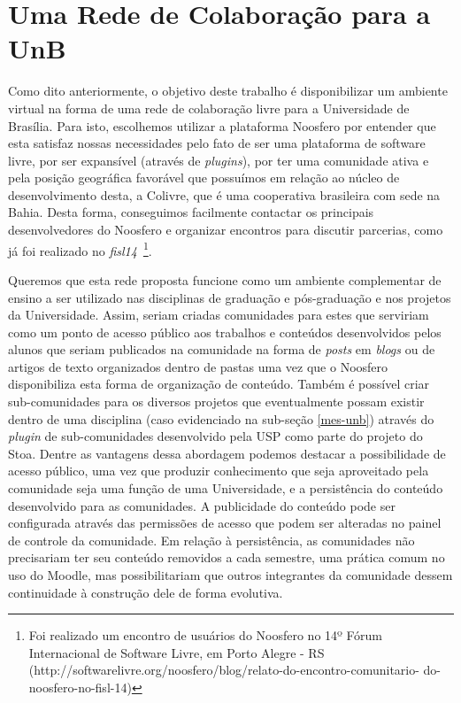 \chapter{Uma Rede de Colaboração para a UnB}

Como dito anteriormente, o objetivo deste trabalho é disponibilizar um ambiente
virtual na forma de uma rede de colaboração livre para a Universidade de
Brasília. Para isto, escolhemos utilizar a plataforma Noosfero por entender que
esta satisfaz nossas necessidades pelo fato de ser uma plataforma de software
livre, por ser expansível (através de \textit{plugins}), por ter uma comunidade
ativa e pela posição geográfica favorável que possuímos em relação ao núcleo de
desenvolvimento desta, a Colivre, que é uma cooperativa brasileira com sede na
Bahia. Desta forma, conseguimos facilmente contactar os principais desenvolvedores
do Noosfero e organizar encontros para discutir parcerias, como já foi realizado
no \textit{fisl14}~\footnote{Foi realizado um encontro de usuários do Noosfero
no 14º Fórum Internacional de Software Livre, em Porto Alegre - RS 
(\url{}http://softwarelivre.org/noosfero/blog/relato-do-encontro-comunitario-
do-noosfero-no-fisl-14)}.

Queremos que esta rede proposta funcione como um ambiente complementar de ensino
a ser utilizado nas disciplinas de graduação e pós-graduação e nos projetos da
Universidade. Assim, seriam criadas comunidades para estes
que serviriam como um ponto de acesso público aos trabalhos e conteúdos
desenvolvidos pelos alunos que seriam publicados
na comunidade na forma de \textit{posts} em \textit{blogs} ou de artigos de
texto organizados dentro de pastas uma vez que o Noosfero disponibiliza esta
forma de organização de conteúdo.
%
Também é possível criar sub-comunidades para os diversos projetos que
eventualmente possam existir dentro de uma disciplina (caso evidenciado na
sub-seção \ref{mes-unb}) através do \textit{plugin} de sub-comunidades
desenvolvido pela USP como parte do projeto do Stoa.
%
Dentre as vantagens dessa abordagem podemos destacar a possibilidade de acesso
público, uma vez que produzir conhecimento que seja aproveitado pela comunidade
seja uma função de uma Universidade, e a persistência do conteúdo desenvolvido
para as comunidades. A publicidade do conteúdo pode ser configurada através das
permissões de acesso que podem ser alteradas no painel de controle da comunidade.
Em relação à persistência, as comunidades não precisariam ter seu conteúdo
removidos a cada semestre, uma prática comum no uso do Moodle, mas
possibilitariam que outros integrantes da comunidade dessem continuidade à
construção dele de forma evolutiva.

